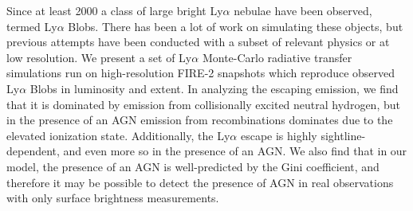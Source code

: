 Since at least 2000 a class of large bright Ly$\alpha$ nebulae have been observed, termed Ly$\alpha$ Blobs.
There has been a lot of work on simulating these objects, but previous attempts have been conducted with a subset of relevant physics or at low resolution.
We present a set of Ly$\alpha$ Monte-Carlo radiative transfer simulations run on high-resolution FIRE-2 snapshots which reproduce observed Ly$\alpha$ Blobs in luminosity and extent.
In analyzing the escaping emission, we find that it is dominated by emission from collisionally excited neutral hydrogen, but in the presence of an AGN emission from recombinations dominates due to the elevated ionization state.
Additionally, the Ly$\alpha$ escape is highly sightline-dependent, and even more so in the presence of an AGN.
We also find that in our model, the presence of an AGN is well-predicted by the Gini coefficient, and therefore it may be possible to detect the presence of AGN in real observations with only surface brightness measurements.
